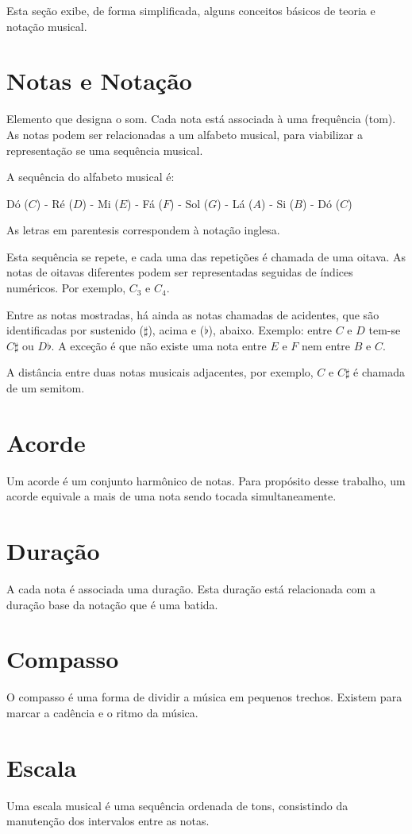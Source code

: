 \label{ape:notacao}

Esta seção exibe, de forma simplificada, alguns conceitos básicos de teoria e notação musical.

\section{Notas e Notação}

Elemento que designa o som. Cada nota está associada à uma frequência (tom). 
As notas podem ser relacionadas a um alfabeto musical, para viabilizar a representação se uma sequência musical.

A sequência do alfabeto musical é:

Dó ($C$) - Ré ($D$) - Mi ($E$) - Fá ($F$) - Sol ($G$) - Lá ($A$) - Si ($B$) - Dó ($C$)

As letras em parentesis correspondem à notação inglesa.

Esta sequência se repete, e cada uma das repetições é chamada de uma oitava. As notas de oitavas diferentes podem ser representadas seguidas de índices numéricos. Por exemplo, $C_3$ e $C_4$.

Entre as notas mostradas, há ainda as notas chamadas de acidentes, que são identificadas por sustenido ($\sharp$), acima e ($\flat$), abaixo. Exemplo: entre $C$ e $D$ tem-se $C\sharp$ ou $D\flat$. A exceção é que não existe uma nota entre $E$ e $F$ nem entre $B$ e $C$.

A distância entre duas notas musicais adjacentes, por exemplo, $C$ e $C\sharp$ é chamada de um semitom.

\section{Acorde}

Um acorde é um conjunto harmônico de notas. Para propósito desse trabalho, um acorde equivale a mais de uma nota sendo tocada simultaneamente.

\section{Duração}

A cada nota é associada uma duração. Esta duração está relacionada com a duração base da notação que é uma batida.

\section{Compasso}

O compasso é uma forma de dividir a música em pequenos trechos. Existem para marcar a cadência e o ritmo da música.

\section{Escala}

Uma escala musical é uma sequência ordenada de tons, consistindo da manutenção dos intervalos entre as notas.